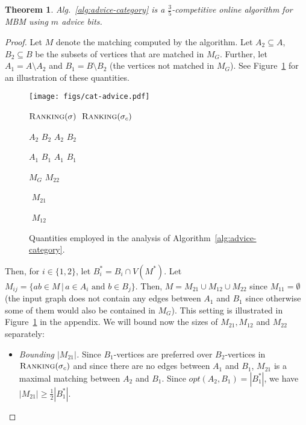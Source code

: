 \documentclass[a4paper]{article}
\newcommand{\Rank}{\textsc{Ranking}}
\newtheorem{theorem}{Theorem}
\begin{document}
\begin{theorem} \label{thm:adv-cat}
 Alg.~\ref{alg:advice-category} is a $\frac{3}{5}$-competitive online algorithm
 for \textsc{MBM} using $m$ advice bits.
\end{theorem}
\begin{proof}
 Let $M$ denote the matching computed by the algorithm.
 Let $A_2 \subseteq A$, $B_2 \subseteq B$ be the subsets of vertices that are matched in $M_G$.
 Further, let $A_1 = A \setminus A_2$ and $B_1 = B \setminus B_2$ (the vertices not matched in $M_G$).
See Figure~\ref{fig:adv-cat} for an illustration of these quantities.

\begin{figure}[H]
{\small
\begin{center}
\texttt{[image: figs/cat-advice.pdf]}

$\Rank(\sigma)$ \hspace{1.9cm} $\,\Rank(\sigma_c)$

\vspace{-2.3cm}

$A_2$ \hspace{1.5cm} $B_2$ \hspace{1.2cm} $A_2$ \hspace{1.5cm} $B_2$

\vspace{0.6cm}

$A_1$ \hspace{1.5cm} $B_1$ \hspace{1.2cm} $A_1$ \hspace{1.5cm} $B_1$

\vspace{-1.6cm}
$M_G$ \hspace{3.2cm} $M_{22}$

\vspace{0.25cm}
$ $  \hspace{3.3cm} $M_{21}$

\vspace{0.59cm}
$ $  \hspace{3.3cm} $M_{12}$

\end{center}
}
\caption{Quantities employed in the analysis of Algorithm~\ref{alg:advice-category}.}
\label{fig:adv-cat}
\end{figure}


 Then, for $i \in \{1, 2\}$, let $B_i^* = B_i \cap V(M^*)$. Let
 $M_{ij} = \{ab \in M \, | \, a \in A_i \mbox{ and } b \in B_j \}$.
 Then, $M = M_{21} \cup M_{12} \cup M_{22}$ since $M_{11} = \emptyset$ (the input graph does
 not contain any edges between $A_1$ and $B_1$ since otherwise some of them would also be contained in $M_G$).
 This setting is illustrated in Figure~\ref{fig:adv-cat} in the appendix. We will bound now the sizes of $M_{21}, M_{12}$ and $M_{22}$ separately:
 \begin{itemize}
  \item \textit{Bounding $|M_{21}|$.} Since $B_1$-vertices are preferred over $B_2$-vertices in
  $\Rank(\sigma_c)$ and since there are no edges between $A_1$ and $B_1$, $M_{21}$ is a maximal matching between
 $A_2$ and $B_1$. Since $opt(A_2, B_1) = |B_1^*|$, we have $|M_{21}| \ge \frac{1}{2} |B_1^*|.$



\end{itemize}
\end{proof}
\end{document}
